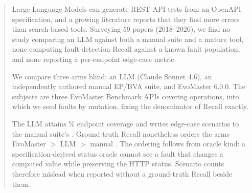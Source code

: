 \begin{abstract}
Large Language Models can generate REST API tests from an OpenAPI specification, and a
growing literature reports that they find more errors than search-based tools. Surveying
59 papers (2018--2026), we find no study comparing an LLM against both a manual suite and
a mature tool, none computing fault-detection Recall against a known fault population, and
none reporting a per-endpoint edge-case metric.

We compare three arms blind: an LLM (Claude Sonnet 4.6), an independently authored manual
EP/BVA suite, and EvoMaster 6.0.0. The subjects are three EvoMaster Benchmark APIs covering
\RQIopsTotal{} operations, into which we seed \RQIIn{} faults by mutation, fixing the
denominator of Recall exactly.

The LLM attains \RQIcoveragePct\% endpoint coverage and writes \RQIIItotalLlm{} edge-case
scenarios to the manual suite's \RQIIItotalManual{}. Ground-truth Recall nonetheless orders
the arms EvoMaster \RQIIrecallEvo{} $>$ LLM \RQIIrecallLlm{} $>$ manual \RQIIrecallManual{}.
The ordering follows from oracle kind: a specification-derived status oracle cannot see a
fault that changes a computed value while preserving the HTTP status. Scenario counts
therefore mislead when reported without a ground-truth Recall beside them.

\end{abstract}
